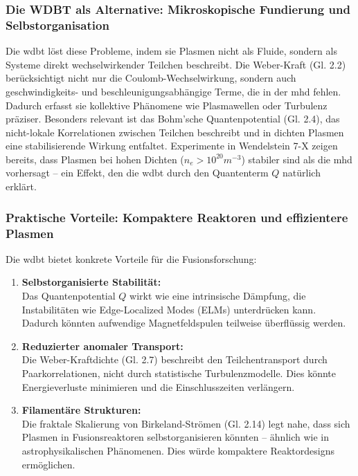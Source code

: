 \subsubsection{Die WDBT als Alternative: Mikroskopische Fundierung und Selbstorganisation}
Die \gls{wdbt} löst diese Probleme, indem sie Plasmen nicht als Fluide, sondern als Systeme direkt wechselwirkender Teilchen beschreibt. Die Weber-Kraft (Gl. 2.2) berücksichtigt nicht
nur die Coulomb-Wechselwirkung, sondern auch geschwindigkeits- und beschleunigungsabhängige Terme, die in der \gls{mhd} fehlen. Dadurch erfasst sie kollektive Phänomene wie Plasmawellen oder
Turbulenz präziser. Besonders relevant ist das Bohm’sche Quantenpotential (Gl. 2.4), das nicht-lokale Korrelationen zwischen Teilchen beschreibt und in dichten Plasmen eine stabilisierende
Wirkung entfaltet. Experimente in Wendelstein 7-X zeigen bereits, dass Plasmen bei hohen Dichten ($n_e > 10^{20}m^{-3}$) stabiler sind als die \gls{mhd} vorhersagt – ein Effekt, den die \gls{wdbt}
durch den Quantenterm $Q$ natürlich erklärt.

\subsubsection{Praktische Vorteile: Kompaktere Reaktoren und effizientere Plasmen}
Die \gls{wdbt} bietet konkrete Vorteile für die Fusionsforschung:

\begin{enumerate}
    \item \textbf{Selbstorganisierte Stabilität:}\\Das Quantenpotential $Q$ wirkt wie eine intrinsische Dämpfung, die Instabilitäten wie Edge-Localized Modes (ELMs) unterdrücken kann. Dadurch könnten aufwendige Magnetfeldspulen teilweise überflüssig werden.
    \item \textbf{Reduzierter anomaler Transport:}\\Die Weber-Kraftdichte (Gl. 2.7) beschreibt den Teilchentransport durch Paarkorrelationen, nicht durch statistische Turbulenzmodelle. Dies könnte Energieverluste minimieren und die Einschlusszeiten verlängern.
    \item \textbf{Filamentäre Strukturen:}\\Die fraktale Skalierung von Birkeland-Strömen (Gl. 2.14) legt nahe, dass sich Plasmen in Fusionsreaktoren selbstorganisieren könnten – ähnlich wie in astrophysikalischen Phänomenen. Dies würde kompaktere Reaktordesigns ermöglichen.
\end{enumerate}

